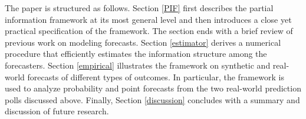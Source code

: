 \documentclass[11pt]{article}
\theoremstyle{definition}
\theoremstyle{definition}
\begin{document}
%





The paper is structured as follows. Section \ref{PIF} first describes the partial information framework at its most general level and then introduces a close yet practical specification of the framework. 
The section ends with a brief review of previous work on modeling forecasts. Section \ref{estimator} derives a numerical procedure that efficiently estimates the information structure among the forecasters. Section \ref{empirical} illustrates the framework on synthetic and real-world forecasts of different types of outcomes. In particular, the framework is used to analyze probability and point forecasts from the two real-world prediction polls discussed above. Finally, Section \ref{discussion} concludes with a summary and discussion of
future research.



%
%
\end{document}
